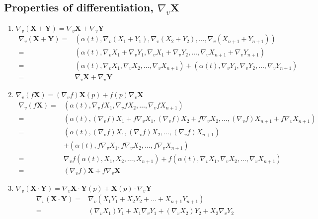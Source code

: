 \subsection{Properties of differentiation, $\nabla_v \mathbf{X}$}
\begin{enumerate}
	\item $\nabla_v (\mathbf{X} + \mathbf{Y}) = \nabla_v \mathbf{X} + \nabla_v \mathbf{Y}$
	\begin{align*}
		\nabla_v (\mathbf{X}+\mathbf{Y}) = & \left( \alpha(t),\nabla_v(X_1+Y_1),\nabla_v (X_2+Y_2),\dots,\nabla_v(X_{n+1}+Y_{n+1}) \right) \\
		= & \left( \alpha(t), \nabla_v X_1 + \nabla_v Y_1, \nabla_v X_1 + \nabla_v Y_2, \dots, \nabla_v X_{n+1} + \nabla_v Y_{n+1} \right) \\
		= & \left( \alpha(t), \nabla_v X_1, \nabla_v X_2, \dots, \nabla_v X_{n+1} \right) + \left( \alpha(t), \nabla_v Y_1, \nabla_v Y_2, \dots, \nabla_v Y_{n+1} \right)\\
		= & \nabla_v \mathbf{X} + \nabla_v \mathbf{Y}
	\end{align*}
	\item $\nabla_v (f\mathbf{X}) = (\nabla_v f)\mathbf{X}(p) + f(p) \nabla_v \mathbf{X}$ 
	\begin{align*}
		\nabla_v (f\mathbf{X}) = & \left( \alpha(t), \nabla_v fX_1, \nabla_v fX_2, \dots, \nabla_v fX_{n+1} \right) \\
		= & \left( \alpha(t), (\nabla_v f) X_1  + f\nabla_v X_1, (\nabla_v f)X_2 + f\nabla_v X_2,\dots,(\nabla_v f)X_{n+1} + f\nabla_v X_{n+1} \right) \\
		= & \left( \alpha(t), (\nabla_v f)X_1,(\nabla_v f)X_2,\dots,(\nabla_v f)X_{n+1} \right)\\
		& + \left( \alpha(t), f\nabla_v X_1, f\nabla_v X_2,\dots, f\nabla_v X_{n+1} \right)\\
		= & \nabla_v f (\alpha(t),X_1,X_2,\dots,X_{n+1}) + f(\alpha(t),\nabla_v X_1,\nabla_v X_2,\dots,\nabla_v X_{n+1})\\
		=& (\nabla_v f)\mathbf{X} + f\nabla_v \mathbf{X}
	\end{align*}
	\item $\nabla_v (\mathbf{X} \cdot \mathbf{Y}) = \nabla_v \mathbf{X} \cdot \mathbf{Y}(p) + \mathbf{X}(p) \cdot \nabla_v \mathbf{Y} $
	\begin{align*}
		\nabla_v(\mathbf{X} \cdot \mathbf{Y}) = & \nabla_v (X_1Y_1 + X_2Y_2 + \dots + X_{n+1}Y_{n+1}) \\
		= & (\nabla_v X_1)Y_1 + X_1\nabla_v Y_1 + (\nabla_v X_2) Y_2 + X_2\nabla_v Y_2\\

\end{align*}
\end{enumerate}
